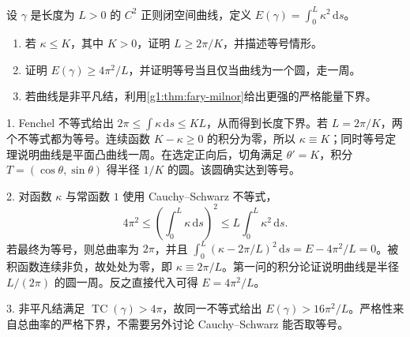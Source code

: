 \begin{exercise}\label{g1:ex:bending-energy-lower-bound}
	设 \(\gamma\) 是长度为 \(L>0\) 的 \(C^2\) 正则闭空间曲线，定义 \(E(\gamma)=\int_0^L\kappa^2\,\mathrm{d}s\)。
	\begin{enumerate}
		\item 若 \(\kappa\le K\)，其中 \(K>0\)，证明 \(L\ge2\pi/K\)，并描述等号情形。
		\item 证明 \(E(\gamma)\ge4\pi^2/L\)，并证明等号当且仅当曲线为一个圆，走一周。
		\item 若曲线是非平凡结，利用\cref{g1:thm:fary-milnor}给出更强的严格能量下界。
	\end{enumerate}
\end{exercise}
\begin{solution}
	1. Fenchel 不等式给出 \(2\pi\le\int\kappa\,\mathrm{d}s\le KL\)，从而得到长度下界。若 \(L=2\pi/K\)，两个不等式都为等号。连续函数 \(K-\kappa\ge0\) 的积分为零，所以 \(\kappa\equiv K\)；同时等号定理说明曲线是平面凸曲线一周。在选定正向后，切角满足 \(\theta'=K\)，积分 \(T=(\cos\theta,\sin\theta)\) 得半径 \(1/K\) 的圆。该圆确实达到等号。

	2. 对函数 \(\kappa\) 与常函数 \(1\) 使用 Cauchy--Schwarz 不等式，
	\[
		4\pi^2\le\left(\int_0^L\kappa\,\mathrm{d}s\right)^2
		\le L\int_0^L\kappa^2\,\mathrm{d}s.
	\]
	若最终为等号，则总曲率为 \(2\pi\)，并且 \(\int_0^L(\kappa-2\pi/L)^2\,\mathrm{d}s=E-4\pi^2/L=0\)。被积函数连续非负，故处处为零，即 \(\kappa\equiv2\pi/L\)。第一问的积分论证说明曲线是半径 \(L/(2\pi)\) 的圆一周。反之直接代入可得 \(E=4\pi^2/L\)。

	3. 非平凡结满足 \(\operatorname{TC}(\gamma)>4\pi\)，故同一不等式给出 \(E(\gamma)>16\pi^2/L\)。严格性来自总曲率的严格下界，不需要另外讨论 Cauchy--Schwarz 能否取等号。
\end{solution}

